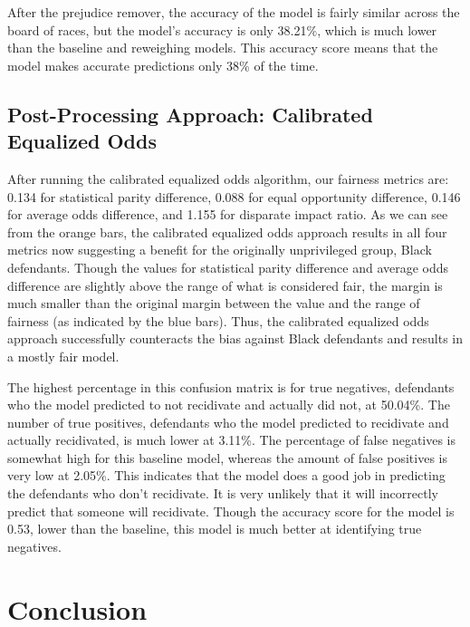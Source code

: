 \documentclass[water,article,submit,moreauthors,pdftex]{mdpi}
\begin{document}
After the prejudice remover, the accuracy of the model is fairly similar
across the board of races, but the model's accuracy is only 38.21\%,
which is much lower than the baseline and reweighing models. This
accuracy score means that the model makes accurate predictions only 38\%
of the time.

\hypertarget{post-processing-approach-calibrated-equalized-odds}{%
\subsection{Post-Processing Approach: Calibrated Equalized
Odds}\label{post-processing-approach-calibrated-equalized-odds}}

After running the calibrated equalized odds algorithm, our fairness
metrics are: 0.134 for statistical parity difference, 0.088 for equal
opportunity difference, 0.146 for average odds difference, and 1.155 for
disparate impact ratio. As we can see from the orange bars, the
calibrated equalized odds approach results in all four metrics now
suggesting a benefit for the originally unprivileged group, Black
defendants. Though the values for statistical parity difference and
average odds difference are slightly above the range of what is
considered fair, the margin is much smaller than the original margin
between the value and the range of fairness (as indicated by the blue
bars). Thus, the calibrated equalized odds approach successfully
counteracts the bias against Black defendants and results in a mostly
fair model.

The highest percentage in this confusion matrix is for true negatives,
defendants who the model predicted to not recidivate and actually did
not, at 50.04\%. The number of true positives, defendants who the model
predicted to recidivate and actually recidivated, is much lower at
3.11\%. The percentage of false negatives is somewhat high for this
baseline model, whereas the amount of false positives is very low at
2.05\%. This indicates that the model does a good job in predicting the
defendants who don't recidivate. It is very unlikely that it will
incorrectly predict that someone will recidivate. Though the accuracy
score for the model is 0.53, lower than the baseline, this model is much
better at identifying true negatives.

\hypertarget{conclusion}{%
\section{Conclusion}\label{conclusion}}
\end{document}

